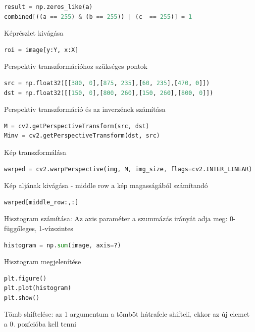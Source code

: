 \documentclass[12pt,a4paper,oneside]{report}             %
\begin{document}
\begin{lstlisting}[language=Python]
result = np.zeros_like(a)
combined[((a == 255) & (b == 255)) | (c  == 255)] = 1
\end{lstlisting}

Képrészlet kivágása

\begin{lstlisting}[language=Python]
roi = image[y:Y, x:X]
\end{lstlisting}

Perspektív transzformációhoz szükséges pontok

\begin{lstlisting}[language=Python]
src = np.float32([[380, 0],[875, 235],[60, 235],[470, 0]])
dst = np.float32([[150, 0],[800, 260],[150, 260],[800, 0]])
\end{lstlisting}

Perspektív transzformáció és az inverzének számítása

\begin{lstlisting}[language=Python]
M = cv2.getPerspectiveTransform(src, dst)
Minv = cv2.getPerspectiveTransform(dst, src)
\end{lstlisting}

Kép transzformálása

\begin{lstlisting}[language=Python]
warped = cv2.warpPerspective(img, M, img_size, flags=cv2.INTER_LINEAR)
\end{lstlisting}

Kép aljának kivágása - middle row a kép magasságából számítandó

\begin{lstlisting}[language=Python]
warped[middle_row:,:]
\end{lstlisting}

Hisztogram számítása: Az axis paraméter a szummázás irányát adja meg: 0-függőleges, 1-vízszintes

\begin{lstlisting}[language=Python]
histogram = np.sum(image, axis=?)
\end{lstlisting}

Hisztogram megjelenítése

\begin{lstlisting}[language=Python]
plt.figure()
plt.plot(histogram)
plt.show()
\end{lstlisting}

Tömb shiftelése: az 1 argumentum a tömböt hátrafele shifteli, ekkor az új elemet a 0. pozícióba kell tenni
\end{document}
